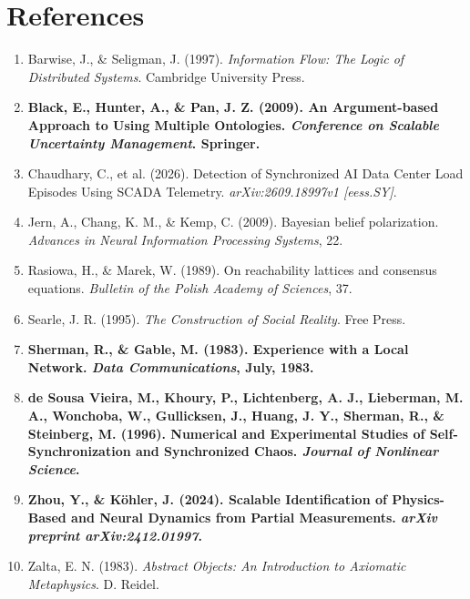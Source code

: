 \documentclass[11pt,fleqn]{article}
\begin{document}
\section{References}
\begin{enumerate}
    \item Barwise, J., \& Seligman, J. (1997). \textit{Information Flow: The Logic of Distributed Systems}. Cambridge University Press.
    \item \textbf{Black, E., Hunter, A., \& Pan, J. Z. (2009). An Argument-based Approach to Using Multiple Ontologies. \textit{Conference on Scalable Uncertainty Management}. Springer.}
    \item Chaudhary, C., et al. (2026). Detection of Synchronized AI Data Center Load Episodes Using SCADA Telemetry. \textit{arXiv:2609.18997v1 [eess.SY]}.
    \item Jern, A., Chang, K. M., \& Kemp, C. (2009). Bayesian belief polarization. \textit{Advances in Neural Information Processing Systems}, 22.
    \item Rasiowa, H., \& Marek, W. (1989). On reachability lattices and consensus equations. \textit{Bulletin of the Polish Academy of Sciences}, 37.
    \item Searle, J. R. (1995). \textit{The Construction of Social Reality}. Free Press.
    \item \textbf{Sherman, R., \& Gable, M. (1983). Experience with a Local Network. \textit{Data Communications}, July, 1983.}
    \item \textbf{de Sousa Vieira, M., Khoury, P., Lichtenberg, A. J., Lieberman, M. A., Wonchoba, W., Gullicksen, J., Huang, J. Y., Sherman, R., \& Steinberg, M. (1996). Numerical and Experimental Studies of Self-Synchronization and Synchronized Chaos. \textit{Journal of Nonlinear Science}.}
    \item \textbf{Zhou, Y., \& K{\"o}hler, J. (2024). Scalable Identification of Physics-Based and Neural Dynamics from Partial Measurements. \textit{arXiv preprint arXiv:2412.01997}.}
    \item Zalta, E. N. (1983). \textit{Abstract Objects: An Introduction to Axiomatic Metaphysics}. D. Reidel.
\end{enumerate}
\end{document}
